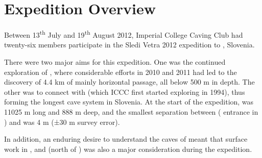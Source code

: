 \section{Expedition Overview}

Between 13\textsuperscript{th} July and 19\textsuperscript{th} August 2012, Imperial College Caving Club had
twenty-six members participate in the Sledi Vetra 2012 expedition to ,
Slovenia.

There were two major aims for this expedition. One was the continued
exploration of , where considerable efforts in 2010 and
2011 had led to the discovery of 4.4 km of mainly horizontal passage,
all below 500 m in depth. The other was to connect  with
 (which ICCC first started exploring in 1994),
thus forming the longest cave system in Slovenia. At the start of the
expedition,  was 11025 m long and 888 m deep, and the
smallest separation between  ( entrance in
) and  was 4 m (±30 m survey error).

In addition, an enduring desire to understand the caves of  meant
that surface work in ,  and  (north of ) was also a major
consideration during the expedition.

